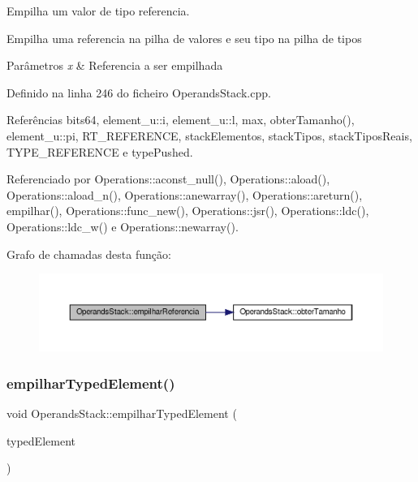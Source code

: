 Empilha um valor de tipo referencia. 

Empilha uma referencia na pilha de valores e seu tipo na pilha de tipos


\begin{DoxyParams}{Parâmetros}
{\em x} & Referencia a ser empilhada \\
\hline
\end{DoxyParams}


Definido na linha 246 do ficheiro Operands\+Stack.\+cpp.



Referências bits64, element\+\_\+u\+::i, element\+\_\+u\+::l, max, obter\+Tamanho(), element\+\_\+u\+::pi, R\+T\+\_\+\+R\+E\+F\+E\+R\+E\+N\+CE, stack\+Elementos, stack\+Tipos, stack\+Tipos\+Reais, T\+Y\+P\+E\+\_\+\+R\+E\+F\+E\+R\+E\+N\+CE e type\+Pushed.



Referenciado por Operations\+::aconst\+\_\+null(), Operations\+::aload(), Operations\+::aload\+\_\+n(), Operations\+::anewarray(), Operations\+::areturn(), empilhar(), Operations\+::func\+\_\+new(), Operations\+::jsr(), Operations\+::ldc(), Operations\+::ldc\+\_\+w() e Operations\+::newarray().

Grafo de chamadas desta função\+:\nopagebreak
\begin{figure}[H]
\begin{center}
\leavevmode
\includegraphics[width=350pt]{classOperandsStack_a47af7d965172984b9cc5c61d8c4c1ce3_cgraph}
\end{center}
\end{figure}
\mbox{\label{classOperandsStack_a73960b4536c99847bf4545a45f04f089}} 
\subsubsection{\texorpdfstring{empilhar\+Typed\+Element()}{empilharTypedElement()}}
{\footnotesize\ttfamily void Operands\+Stack\+::empilhar\+Typed\+Element (\begin{DoxyParamCaption}\item[{\hyperlink{BasicTypes_8h_a97b332303b1262282599e6ede0637b82}{Typed\+Element}}]{typed\+Element }\end{DoxyParamCaption})}



